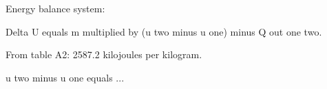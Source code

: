 Energy balance system:  

Delta U equals m multiplied by (u two minus u one) minus Q out one two.  

From table A2: 2587.2 kilojoules per kilogram.  

u two minus u one equals ...